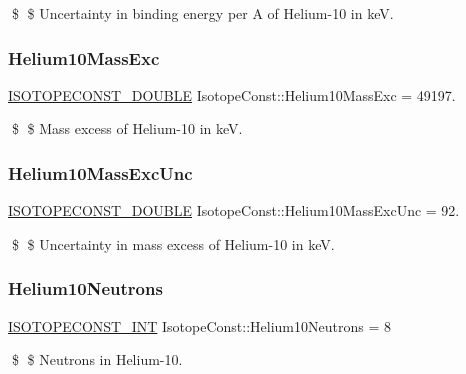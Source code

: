 \$ \$ Uncertainty in binding energy per A of Helium-\/10 in keV. \mbox{\label{group___isotope_const-_helium-_he10_ga0d27f6e3ef7231a1f4f177d2822b1acc}} 
\subsubsection{\texorpdfstring{Helium10\+Mass\+Exc}{Helium10MassExc}}
{\footnotesize\ttfamily \mbox{\hyperlink{group___isotope_const-_macros_ga8f45a7272ce02c0b4c65c44636ed719a}{I\+S\+O\+T\+O\+P\+E\+C\+O\+N\+S\+T\+\_\+\+D\+O\+U\+B\+LE}} Isotope\+Const\+::\+Helium10\+Mass\+Exc = 49197.}

\$ \$ Mass excess of Helium-\/10 in keV. \mbox{\label{group___isotope_const-_helium-_he10_gaf224dd2276fd21fb6f3ee1b44afc4f11}} 
\subsubsection{\texorpdfstring{Helium10\+Mass\+Exc\+Unc}{Helium10MassExcUnc}}
{\footnotesize\ttfamily \mbox{\hyperlink{group___isotope_const-_macros_ga8f45a7272ce02c0b4c65c44636ed719a}{I\+S\+O\+T\+O\+P\+E\+C\+O\+N\+S\+T\+\_\+\+D\+O\+U\+B\+LE}} Isotope\+Const\+::\+Helium10\+Mass\+Exc\+Unc = 92.}

\$ \$ Uncertainty in mass excess of Helium-\/10 in keV. \mbox{\label{group___isotope_const-_helium-_he10_ga3236142ca4081f111857daf8d4cd10c2}} 
\subsubsection{\texorpdfstring{Helium10\+Neutrons}{Helium10Neutrons}}
{\footnotesize\ttfamily \mbox{\hyperlink{group___isotope_const-_macros_ga5f18360b3e99483a35c32d789e62621c}{I\+S\+O\+T\+O\+P\+E\+C\+O\+N\+S\+T\+\_\+\+I\+NT}} Isotope\+Const\+::\+Helium10\+Neutrons = 8}

\$ \$ Neutrons in Helium-\/10. \mbox{\label{group___isotope_const-_helium-_he10_gaf5987e16ae3bc4a247a41509ca6c8ffe}} 
